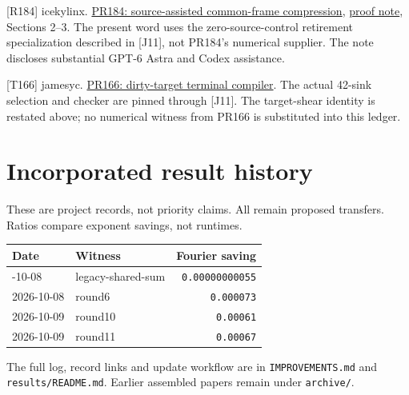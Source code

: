 \documentclass[
  11pt,
]{article}
\newcounter{none} %
\begin{document}
{[}R184{]} icekylinx.
\href{https://github.com/CrocSwap/integer-mult-bounds/pull/184}{PR184:
source-assisted common-frame compression},
\href{https://github.com/icekylinx/integer-mult-bounds/blob/4b5fc7fb45a77b6c7b9d886d30ad5b57eae553fa/notes/source-assisted-note.tex}{proof
note}, Sections 2--3. The present word uses the zero-source-control
retirement specialization described in {[}J11{]}, not PR184's numerical
supplier. The note discloses substantial GPT-6 Astra and Codex
assistance.

{[}T166{]} jamesyc.
\href{https://github.com/CrocSwap/integer-mult-bounds/pull/166}{PR166:
dirty-target terminal compiler}. The actual 42-sink selection and
checker are pinned through {[}J11{]}. The target-shear identity is
restated above; no numerical witness from PR166 is substituted into this
ledger.

\section{Incorporated result history}\label{incorporated-result-history}

These are project records, not priority claims. All remain proposed
transfers. Ratios compare exponent savings, not runtimes.

{\def\LTcaptype{none} %
\begin{longtable}[]{@{}llr@{}}
\toprule\noalign{}
Date & Witness & Fourier saving \\
\midrule\noalign{}
\endhead
\bottomrule\noalign{}
\endlastfoot
2026-10-08 & legacy-shared-sum & \texttt{0.00000000055} \\
2026-10-08 & round6 & \texttt{0.000073} \\
2026-10-09 & round10 & \texttt{0.00061} \\
2026-10-09 & round11 & \texttt{0.00067} \\
\end{longtable}
}

The full log, record links and update workflow are in
\texttt{IMPROVEMENTS.md} and \texttt{results/\allowbreak{}README.md}. Earlier
assembled papers remain under \texttt{archive/\allowbreak{}}.
\end{document}
